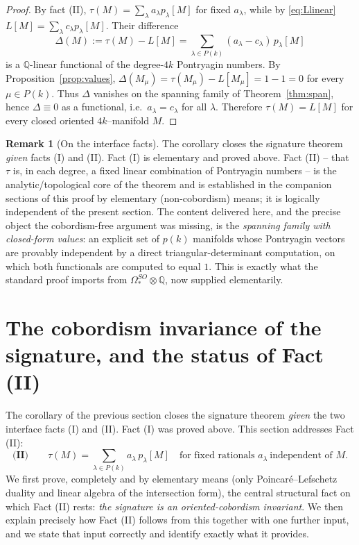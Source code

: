 \documentclass[12pt]{article}
\theoremstyle{definition}
\newtheorem{remark}{Remark}
\begin{document}
\begin{proof}
By fact (II), $\tau(M)=\sum_\lambda a_\lambda p_\lambda[M]$ for fixed $a_\lambda$, while by
\eqref{eq:Llinear} $L[M]=\sum_\lambda c_\lambda p_\lambda[M]$.  Their difference
\[
\Delta(M):=\tau(M)-L[M]=\sum_{\lambda\in P(k)}(a_\lambda-c_\lambda)\,p_\lambda[M]
\]
is a $\mathbb{Q}$-linear functional of the degree-$4k$ Pontryagin numbers.  By
Proposition~\ref{prop:values}, $\Delta(M_\mu)=\tau(M_\mu)-L[M_\mu]=1-1=0$ for every
$\mu\in P(k)$.  Thus $\Delta$ vanishes on the spanning family of
Theorem~\ref{thm:span}, hence $\Delta\equiv 0$ as a functional, i.e.\
$a_\lambda=c_\lambda$ for all $\lambda$.  Therefore $\tau(M)=L[M]$ for every closed
oriented $4k$--manifold $M$.
\end{proof}

\bigskip

\begin{remark}[On the interface facts]
The corollary closes the signature theorem \emph{given} facts (I) and (II).  Fact (I) is
elementary and proved above.  Fact (II) -- that $\tau$ is, in each degree, a fixed linear
combination of Pontryagin numbers -- is the analytic/topological core of the theorem and
is established in the companion sections of this proof by elementary (non-cobordism)
means; it is logically independent of the present section.  The content delivered here,
and the precise object the cobordism-free argument was missing, is the
\emph{spanning family with closed-form values}: an explicit set of $p(k)$ manifolds whose
Pontryagin vectors are provably independent by a direct triangular-determinant
computation, on which both functionals are computed to equal $1$.  This is exactly what
the standard proof imports from $\Omega^{SO}_\ast\otimes\mathbb{Q}$, now supplied
elementarily.
\end{remark}

\bigskip

\section{The cobordism invariance of the signature, and the status of Fact
(II)}\label{sec:factII}

The corollary of the previous section closes the signature theorem \emph{given} the two
interface facts (I) and (II).  Fact (I) was proved above.  This section addresses Fact
(II):
\[
\textbf{(II)}\qquad
\tau(M)=\sum_{\lambda\in P(k)}a_\lambda\,p_\lambda[M]
\quad\text{for fixed rationals }a_\lambda\ \text{independent of }M .
\]
We first prove, completely and by elementary means (only Poincar\'e--Lefschetz duality
and linear algebra of the intersection form), the central structural fact on which Fact
(II) rests: \emph{the signature is an oriented-cobordism invariant}.  We then explain
precisely how Fact (II) follows from this together with one further input, and we state
that input correctly and identify exactly what it provides.
\end{document}

